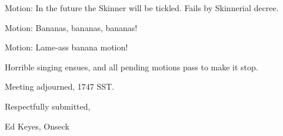 \documentclass[12pt]{article}
\begin{document}
Motion: In the future the Skinner will be tickled.  Fails by
Skinnerial decree.

Motion: Bananas, bananas, bananas!

Motion: Lame-ass banana motion!

Horrible singing ensues, and all pending motions pass to make it
stop.

\vspace{12pt}

\noindent
Meeting adjourned, 1747 SST.

\vspace{18pt}

\centerline{Respectfully submitted,}
\centerline{Ed Keyes, Onseck}
\end{document}
